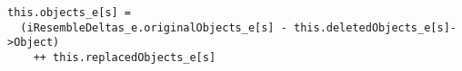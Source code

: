 \lstset{frame=tb, aboveskip=12pt, belowskip=-3pt, breaklines=true, basicstyle=\small\ttfamily, tabsize=2, mathescape=true}
\begin{lstlisting}[caption={deltas.als, lines 157-159}, label=alloy:savcbs-resolve-V, captionpos=b]
this.objects_e[s] = 
  (iResembleDeltas_e.originalObjects_e[s] - this.deletedObjects_e[s]->Object)
    ++ this.replacedObjects_e[s]
\end{lstlisting}